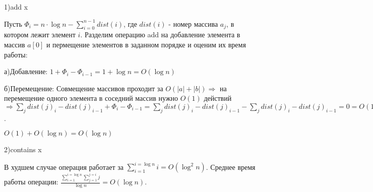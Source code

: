 \documentclass{article}
\begin{document}
\begin{flushleft}
1)add x

Пусть $\Phi_i = n \cdot \log{n} - \sum\limits_{i = 0}^{n - 1}{dist(i)}$, где $dist(i)$ - номер массива $a_j$, в котором лежит элемент $i$. Разделим операцию add на добавление элемента в массив $a[0]$ и пермещение элементов в заданном порядке и оценим их время работы:

а)Добавление: $1 + \Phi_i - \Phi_{i - 1} = 1 + \log{n} = O(\log{n})$

б)Перемещение: Совмещение массивов проходит за $O(|a| + |b|) \Rightarrow$ на перемещение одного элемента в соседний массив нужно $O(1)$ действий  $\Rightarrow \sum\limits_{j}{dist(j)_i - dist(j)_{i - 1}} + \Phi_i - \Phi_{i - 1} = \sum\limits_{j}{dist(j)_i - dist(j)_{i - 1}} - \sum\limits_{j}{dist(j)_i - dist(j)_{i - 1}} = 0 = O(1)$.

$O(1) + O(\log{n}) = O(\log{n})$


2)contains x

В худшем случае операция работает за $\sum\limits_{i = 1}^{i = \log{n}}{i} = O(\log^2{n})$. Среднее время работы операции: $\frac{\sum\limits_{i = 1}^{i = \log{n}}{\sum\limits_{j = 1}^{j = i}{j}}}{\log{n}} = O(\log{n})$.
\end{flushleft}
\end{document}
